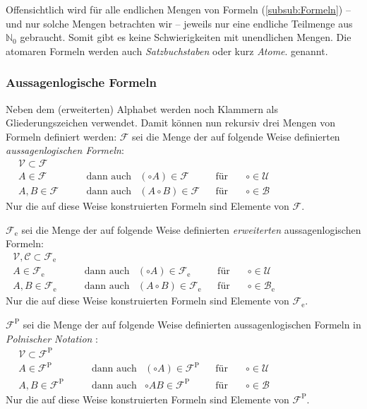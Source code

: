 \documentclass[english,ngerman,parskip=half,headsepline,footsepline,
	fleqn,notitlepage]{scrreprt}
\newcommand*{\ase}{_\mathrm{e}}%
\newcommand*{\asp}{^\mathrm{P}}%
\newcommand*{\asN}{\mathbb{N}_0}%
\newcommand*{\asB}{\mathcal{B}}%
\newcommand*{\asC}{\mathcal{C}}%
\newcommand*{\asF}{\mathcal{F}}%
\newcommand*{\asU}{\mathcal{U}}%
\newcommand*{\asV}{\mathcal{V}}%
\newcommand*{\asBe}{\asB\ase}%
\newcommand*{\asFe}{\asF\ase}%
\newcommand*{\asFp}{\asF\asp}%
\newcommand*{\formulatoleft}{&&&&&&&&&&}%
\newcommand*{\Idx}[1]{#1\idx{#1}}%
\begin{document}
	Offensichtlich wird für alle endlichen Mengen von Formeln
	(\seename \vref{subsub:Formeln})
	-- und nur solche Mengen betrachten wir --
	jeweils nur eine endliche Teilmenge aus $\asN$ gebraucht.
	Somit gibt es keine Schwierigkeiten mit unendlichen Mengen.
	Die atomaren Formeln werden auch \emph{\Idx{Satzbuchstabe}}\emph{n}
	oder kurz \emph{\Idx{Atom}}\emph{e}. genannt.

	\subsubsection{Aussagenlogische Formeln}%
	\label{subsub:Formeln}

	Neben dem (erweiterten) Alphabet
	werden noch Klammern als Gliederungszeichen verwendet.
	Damit können nun rekursiv drei Mengen von Formeln definiert werden:
	$\asF$ sei die Menge der auf folgende Weise definierten
	\emph{aussagenlogischen Formeln}:
	\begin{align}
		\asV    \subset \asF \\
		A           \in \asF &   \quad \quad \textrm{dann auch} &
		(\circ A)   \in \asF & & \textrm{für} \quad & \circ \in \asU \\
		A, B        \in \asF &   \quad \quad \textrm{dann auch} &
		(A \circ B) \in \asF & & \textrm{für} \quad & \circ \in \asB
		\formulatoleft
	\end{align}
	Nur die auf diese Weise konstruierten Formeln sind Elemente von $\asF$.

	$\asFe$ sei die Menge der auf folgende Weise definierten \emph{erweiterten}
	aussagenlogischen Formeln:
	\begin{align}
		\asV, \asC \subset \asFe \\
		A              \in \asFe & \quad \quad \textrm{dann auch} &
		(\circ A)      \in \asFe & & \textrm{für} \quad & \circ \in \asU  \\
		A, B           \in \asFe & \quad \quad \textrm{dann auch} &
		(A \circ B)    \in \asFe & & \textrm{für} \quad & \circ \in \asBe
		\formulatoleft
	\end{align}
	Nur die auf diese Weise konstruierten Formeln sind Elemente von $\asFe$.

	$\asFp$ sei die Menge der auf folgende Weise definierten
	aussagenlogischen Formeln in \emph{Polnischer Notation}%
	:
	\begin{align}
		\asV    \subset \asFp \\
		A           \in \asFp &   \quad \quad \textrm{dann auch} &
		(\circ A)   \in \asFp & & \textrm{für} \quad & \circ \in \asU \\
		A, B        \in \asFp &   \quad \quad \textrm{dann auch} &
		\circ A B   \in \asFp & & \textrm{für} \quad & \circ \in \asB
		\formulatoleft
	\end{align}
	Nur die auf diese Weise konstruierten Formeln sind Elemente von $\asFp$.
\end{document}
